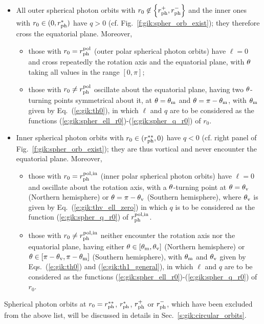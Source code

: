 \begin{prop}
\begin{itemize}
\item All outer spherical photon orbits with $r_0\not\in \left\{r_{\rm ph}^+, r_{\rm ph}^-\right\}$ and the inner ones with $r_0\in (0, r_{\rm ph}^{*})$
have $q>0$ (cf. Fig.~\ref{f:gik:spher_orb_exist}); they therefore cross the equatorial plane.
Moreover,
\begin{itemize}
\item those with $r_0 = r_{\rm ph}^{\rm pol}$ (outer polar spherical photon orbits)
have $\ell=0$
and cross repeatedly the rotation axis and the equatorial plane, with $\theta$
taking all values in the range $[0,\pi]$;
\item those with $r_0 \neq r_{\rm ph}^{\rm pol}$
oscillate about the equatorial plane, having two $\theta$-turning points
symmetrical about it, at $\theta=\theta_{\rm m}$ and $\theta=\pi-\theta_{\rm m}$, with
$\theta_{\rm m}$ given by Eq.~(\ref{e:gik:th0}),
in which $\ell$ and $q$ are to be considered as the functions
(\ref{e:gik:spher_ell_r0})-(\ref{e:gik:spher_q_r0}) of $r_0$.
\end{itemize}
\item Inner spherical photon orbits with $r_0 \in (r_{\rm ph}^{**}, 0)$
have $q<0$ (cf. right panel of Fig.~\ref{f:gik:spher_orb_exist}); they are thus vortical
and never encounter the equatorial plane. Moreover,
\begin{itemize}
\item those with $r_0 = r_{\rm ph}^{\rm pol, in}$ (inner polar spherical photon orbits)
have $\ell=0$ and oscillate about the rotation axis,
with a $\theta$-turning point at
$\theta=\theta_{\rm v}$ (Northern hemisphere) or $\theta = \pi - \theta_{\rm v}$ (Southern hemisphere),
where $\theta_{\rm v}$
is given by Eq.~(\ref{e:gik:thv_ell_zero}) in which $q$ is to be considered
as the function (\ref{e:gik:spher_q_r0}) of $r_{\rm ph}^{\rm pol, in}$.
\item those with $r_0 \neq r_{\rm ph}^{\rm pol, in}$ neither encounter the rotation axis nor the
equatorial plane, having
either $\theta\in[\theta_{\rm m}, \theta_{\rm v}]$ (Northern hemisphere)
or $\theta\in[\pi-\theta_{\rm v}, \pi-\theta_{\rm m}]$ (Southern hemisphere), with
$\theta_{\rm m}$ and $\theta_{\rm v}$ given by Eqs.~(\ref{e:gik:th0}) and (\ref{e:gik:th1_general}), in which
$\ell$ and $q$ are to be considered as the functions
(\ref{e:gik:spher_ell_r0})-(\ref{e:gik:spher_q_r0}) of $r_0$.
\end{itemize}
\end{itemize}
Spherical photon orbits at $r_0 = r_{\rm ph}^{**}$, $r_{\rm ph}^*$, $r_{\rm ph}^+$ or $r_{\rm ph}^-$,
which have been excluded from the above list,
will be discussed in details in Sec.~\ref{s:gik:circular_orbits}.
\end{prop}

